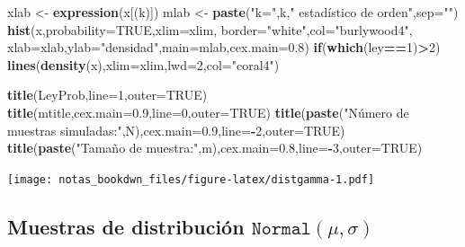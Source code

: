 \documentclass[]{book}
\newenvironment{Shaded}{\begin{snugshade}}{\end{snugshade}}
\newcommand{\ControlFlowTok}[1]{\textcolor[rgb]{0.13,0.29,0.53}{\textbf{#1}}}
\newcommand{\DataTypeTok}[1]{\textcolor[rgb]{0.13,0.29,0.53}{#1}}
\newcommand{\DecValTok}[1]{\textcolor[rgb]{0.00,0.00,0.81}{#1}}
\newcommand{\FloatTok}[1]{\textcolor[rgb]{0.00,0.00,0.81}{#1}}
\newcommand{\KeywordTok}[1]{\textcolor[rgb]{0.13,0.29,0.53}{\textbf{#1}}}
\newcommand{\NormalTok}[1]{#1}
\newcommand{\OperatorTok}[1]{\textcolor[rgb]{0.81,0.36,0.00}{\textbf{#1}}}
\newcommand{\OtherTok}[1]{\textcolor[rgb]{0.56,0.35,0.01}{#1}}
\newcommand{\StringTok}[1]{\textcolor[rgb]{0.31,0.60,0.02}{#1}}
\begin{document}
\begin{Shaded}
\begin{Highlighting}[]
\NormalTok{xlab <-}\StringTok{ }\KeywordTok{expression}\NormalTok{(x[(k)])}
\NormalTok{mlab <-}\StringTok{ }\KeywordTok{paste}\NormalTok{(}\StringTok{"k="}\NormalTok{,k,}\StringTok{" estadístico de orden"}\NormalTok{,}\DataTypeTok{sep=}\StringTok{""}\NormalTok{)}
\KeywordTok{hist}\NormalTok{(x,}\DataTypeTok{probability=}\OtherTok{TRUE}\NormalTok{,}\DataTypeTok{xlim=}\NormalTok{xlim,}
    \DataTypeTok{border=}\StringTok{"white"}\NormalTok{,}\DataTypeTok{col=}\StringTok{"burlywood4"}\NormalTok{,}
    \DataTypeTok{xlab=}\NormalTok{xlab,}\DataTypeTok{ylab=}\StringTok{"densidad"}\NormalTok{,}\DataTypeTok{main=}\NormalTok{mlab,}\DataTypeTok{cex.main=}\FloatTok{0.8}\NormalTok{)}
\ControlFlowTok{if}\NormalTok{(}\KeywordTok{which}\NormalTok{(ley}\OperatorTok{==}\DecValTok{1}\NormalTok{)}\OperatorTok{>}\DecValTok{2}\NormalTok{) }\KeywordTok{lines}\NormalTok{(}\KeywordTok{density}\NormalTok{(x),}\DataTypeTok{xlim=}\NormalTok{xlim,}\DataTypeTok{lwd=}\DecValTok{2}\NormalTok{,}\DataTypeTok{col=}\StringTok{"coral4"}\NormalTok{)}

\KeywordTok{title}\NormalTok{(LeyProb,}\DataTypeTok{line=}\DecValTok{1}\NormalTok{,}\DataTypeTok{outer=}\OtherTok{TRUE}\NormalTok{)}
\KeywordTok{title}\NormalTok{(mtitle,}\DataTypeTok{cex.main=}\FloatTok{0.9}\NormalTok{,}\DataTypeTok{line=}\DecValTok{0}\NormalTok{,}\DataTypeTok{outer=}\OtherTok{TRUE}\NormalTok{)}
\KeywordTok{title}\NormalTok{(}\KeywordTok{paste}\NormalTok{(}\StringTok{"Número de muestras simuladas:"}\NormalTok{,N),}\DataTypeTok{cex.main=}\FloatTok{0.9}\NormalTok{,}\DataTypeTok{line=}\OperatorTok{-}\DecValTok{2}\NormalTok{,}\DataTypeTok{outer=}\OtherTok{TRUE}\NormalTok{)}
\KeywordTok{title}\NormalTok{(}\KeywordTok{paste}\NormalTok{(}\StringTok{"Tamaño de muestra:"}\NormalTok{,m),}\DataTypeTok{cex.main=}\FloatTok{0.8}\NormalTok{,}\DataTypeTok{line=}\OperatorTok{-}\DecValTok{3}\NormalTok{,}\DataTypeTok{outer=}\OtherTok{TRUE}\NormalTok{)}
\end{Highlighting}
\end{Shaded}

\texttt{[image: notas\_bookdwn\_files/figure-latex/distgamma-1.pdf]}

\hypertarget{muestras-de-distribuciuxf3n-textttnormalmu-sigma}{%
\subsection{\texorpdfstring{Muestras de distribución \(\texttt{Normal}(\mu, \sigma)\)}{Muestras de distribución \textbackslash{}texttt\{Normal\}(\textbackslash{}mu, \textbackslash{}sigma)}}\label{muestras-de-distribuciuxf3n-textttnormalmu-sigma}}
\end{document}
